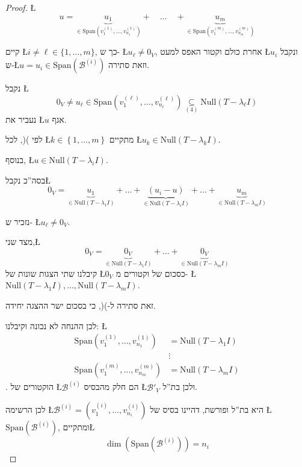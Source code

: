 \documentclass[english,hebrew]{article}
\begin{document}
\begin{proof}
\L{%
\[
u=\underset{\in\text{Span}\left(v_{1}^{(1)},\dots,v_{n_{1}}^{(1)}\right)}{\underbrace{u_{1}}}+\quad\dots\quad+\underset{\in\text{Span}\left(v_{1}^{(m)},\dots,v_{n_{m}}^{(m)}\right)}{\underbrace{u_{m}}}
\]
}%

קיים \L{$i\ne\ell\in\{1,\dots,m\}$}, כך ש- \L{$u_{\ell}\neq0_{V}$},
אחרת כולם וקטור האפס למעט \L{$u_{i}$} ונקבל ש-\L{$u=u_{i}\in\text{Span}\left(\mathcal{B}^{(i)}\right)$}
וזאת סתירה.

נקבל \L{%
\[
0_{V}\neq u_{\ell}\in\text{Span}\left(v_{1}^{(\ell)},\dots,v_{n_{\ell}}^{(\ell)}\right)\underset{(4)}{\subseteq}\text{Null}(T-\lambda_{\ell}I)
\]
}%
נעביר את \L{$u$} אגף.

לפי ){\endL}(, לכל \L{$k\in\left\{ 1,\dots,m\right\} $}
מתקיים \L{$u_{k}\in\text{Null}(T-\lambda_{k}I)$}.

בנוסף, \L{$u\in\text{Null}(T-\lambda_{i}I)$}.

בסה\textquotedblright כ נקבל\L{%
\[
0_{V}=\underset{\in\text{Null}(T-\lambda_{1}I)}{\underbrace{u_{1}}}+\dots+\underset{\in\text{Null}(T-\lambda_{i}I)}{\underbrace{(u_{i}-u)}}+\dots+\underset{\in\text{Null}(T-\lambda_{m}I)}{\underbrace{u_{m}}}
\]
}%

נזכיר ש- \L{$u_{\ell}\neq0_{V}$}.

מצד שני,\L{%
\[
0_{V}=\underset{\in\text{Null}(T-\lambda_{1}I)}{\underbrace{0_{V}}}+\dots+\underset{\in\text{Null}(T-\lambda_{m}I)}{\underbrace{0_{V}}}
\]
}%
קיבלנו שתי הצגות שונות של \L{$0_{V}$} כסכום של וקטורים מ- \L{$\text{Null}(T-\lambda_{1}I),\dots,\text{Null}(T-\lambda_{m}I)$}.

זאת סתירה ל-){\endL}(, כי בסכום ישר ההצגה יחידה.

לכן ההנחה לא נכונה וקיבלנו: \L{%
\begin{align*}
\text{Span}\left(v_{1}^{(1)},\dots,v_{n_{1}}^{(1)}\right) & =\text{Null}(T-\lambda_{1}I)\\
 & \vdots\\
\text{Span}\left(v_{1}^{(m)},\dots,v_{n_{m}}^{(m)}\right) & =\text{Null}(T-\lambda_{m}I)
\end{align*}
}%
{\endL}. הוקטורים של \L{$\mathcal{B}^{(i)}$} הם חלק מהבסיס
\L{$\mathcal{B}'_{V}$} ולכן בת\textquotedblright ל.

לכן הרשימה \L{$\mathcal{B}^{(i)}=\left(v_{1}^{(i)},\dots,v_{n_{i}}^{(i)}\right)$}
היא בת\textquotedblright ל ופורשת, דהיינו בסיס של \L{$\text{Span}\left(\mathcal{B}^{(i)}\right)$},
ומתקיים\L{%
\[
\dim\left(\text{Span}\left(\mathcal{B}^{(i)}\right)\right)=n_{i}
\]
}%


\end{proof}
\end{document}

